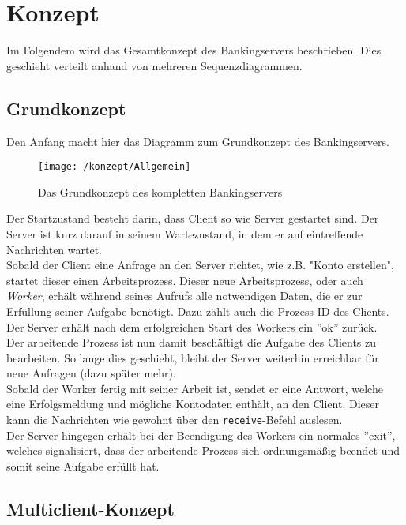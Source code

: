 \section{Konzept}

Im Folgendem wird das Gesamtkonzept des Bankingservers beschrieben. Dies geschieht verteilt anhand von mehreren Sequenzdiagrammen.\\

\subsection{Grundkonzept}

Den Anfang macht hier das Diagramm zum Grundkonzept des Bankingservers.

\begin{figure}[H]
\centering
\texttt{[image: /konzept/Allgemein]}
\caption{Das Grundkonzept des kompletten Bankingservers}
\label{fig:grundkonzept}
\end{figure}

Der Startzustand besteht darin, dass Client so wie Server gestartet sind. Der Server ist kurz darauf in seinem Wartezustand, in dem er auf eintreffende Nachrichten wartet.\\
Sobald der Client eine Anfrage an den Server richtet, wie z.B. "Konto erstellen", startet dieser einen Arbeitsprozess. Dieser neue Arbeitsprozess, oder auch \textit{Worker}, erhält während seines Aufrufs alle notwendigen Daten, die er zur Erfüllung seiner Aufgabe benötigt. Dazu zählt auch die Prozess-ID des Clients.\\
Der Server erhält nach dem erfolgreichen Start des Workers ein ''ok'' zurück.\\
Der arbeitende Prozess ist nun damit beschäftigt die Aufgabe des Clients zu bearbeiten. So lange dies geschieht, bleibt der Server weiterhin erreichbar für neue Anfragen (dazu später mehr).\\
Sobald der Worker fertig mit seiner Arbeit ist, sendet er eine Antwort, welche eine Erfolgsmeldung und mögliche Kontodaten enthält, an den Client. Dieser kann die Nachrichten wie gewohnt über den \texttt{receive}-Befehl auslesen.\\
Der Server hingegen erhält bei der Beendigung des Workers ein normales ''exit'', welches signalisiert, dass der arbeitende Prozess sich ordnungsmäßig beendet und somit seine Aufgabe erfüllt hat.

\subsection{Multiclient-Konzept}

